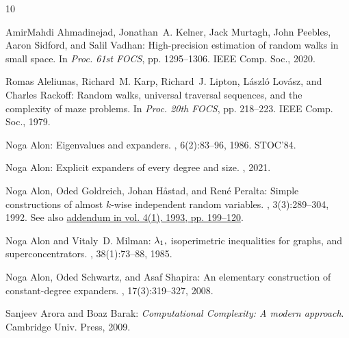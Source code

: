 \documentclass[11pt]{article}
\numberwithin{equation}{section}
\theoremstyle{definition}
\theoremstyle{plain}
\numberwithin{myalgctr}{section}
\theoremstyle{named}
\begin{document}
\tocrefpdfbookmark
\begin{thebibliography}{10}

{\sc AmirMahdi Ahmadinejad, Jonathan~A. Kelner, Jack Murtagh, John Peebles,
  Aaron Sidford, and Salil Vadhan}: High-precision estimation of random walks
  in small space.
\newblock In {\em Proc. 61st FOCS}, pp. 1295--1306. IEEE Comp. Soc., 2020.

{\sc Romas Aleliunas, Richard~M. Karp, Richard~J. Lipton, L{\'a}szl{\'o}
  Lov{\'a}sz, and Charles Rackoff}: Random walks, universal traversal
  sequences, and the complexity of maze problems.
\newblock In {\em Proc. 20th FOCS}, pp. 218--223. IEEE Comp. Soc., 1979.

{\sc Noga Alon}: Eigenvalues and expanders.
, 6(2):83--96, 1986.
\newblock \prelim STOC'84.
\newblock [\epfmtdoi{10.1007/BF02579166}]

{\sc Noga Alon}: Explicit expanders of every degree and size.
, 2021.

{\sc Noga Alon, Oded Goldreich, Johan H{\aa}stad, and Ren{\'e} Peralta}: Simple
  constructions of almost {$k$}-wise independent random variables.
, 3(3):289--304, 1992.
\newblock See also \href{https://doi.org/10.1002/rsa.3240040109}{addendum in
  vol. 4(1), 1993, pp. 199--120}.

{\sc Noga Alon and Vitaly~D. Milman}: $\lambda\sb 1,$ isoperimetric
  inequalities for graphs, and superconcentrators.
, 38(1):73--88, 1985.
\newblock [\epfmtdoi{10.1016/0095-8956(85)90092-9}]

{\sc Noga Alon, Oded Schwartz, and Asaf Shapira}: An elementary construction of
  constant-degree expanders.
, 17(3):319--327, 2008.
\newblock [\epfmtdoi{10.1017/S0963548307008851}]

{\sc Sanjeev Arora and Boaz Barak}: {\em Computational Complexity: {A} modern
  approach}.
\newblock Cambridge Univ. Press, 2009.


\end{thebibliography}
\end{document}
